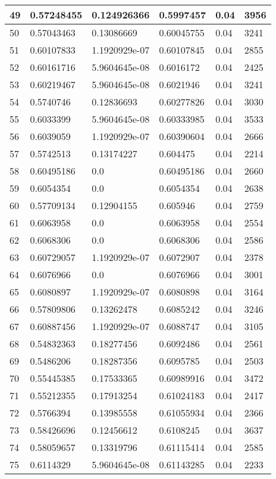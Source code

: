 \begin{longtable}{|l|l|l|l|l|l|}
49 & 0.57248455 & 0.124926366 & 0.5997457 & 0.04 & 3956 \\ \hline 
50 & 0.57043463 & 0.13086669 & 0.60045755 & 0.04 & 3241 \\ \hline 
51 & 0.60107833 & 1.1920929e-07 & 0.60107845 & 0.04 & 2855 \\ \hline 
52 & 0.60161716 & 5.9604645e-08 & 0.6016172 & 0.04 & 2425 \\ \hline 
53 & 0.60219467 & 5.9604645e-08 & 0.6021946 & 0.04 & 3241 \\ \hline 
54 & 0.5740746 & 0.12836693 & 0.60277826 & 0.04 & 3030 \\ \hline 
55 & 0.6033399 & 5.9604645e-08 & 0.60333985 & 0.04 & 3533 \\ \hline 
56 & 0.6039059 & 1.1920929e-07 & 0.60390604 & 0.04 & 2666 \\ \hline 
57 & 0.5742513 & 0.13174227 & 0.604475 & 0.04 & 2214 \\ \hline 
58 & 0.60495186 & 0.0 & 0.60495186 & 0.04 & 2660 \\ \hline 
59 & 0.6054354 & 0.0 & 0.6054354 & 0.04 & 2638 \\ \hline 
60 & 0.57709134 & 0.12904155 & 0.605946 & 0.04 & 2759 \\ \hline 
61 & 0.6063958 & 0.0 & 0.6063958 & 0.04 & 2554 \\ \hline 
62 & 0.6068306 & 0.0 & 0.6068306 & 0.04 & 2586 \\ \hline 
63 & 0.60729057 & 1.1920929e-07 & 0.6072907 & 0.04 & 2378 \\ \hline 
64 & 0.6076966 & 0.0 & 0.6076966 & 0.04 & 3001 \\ \hline 
65 & 0.6080897 & 1.1920929e-07 & 0.6080898 & 0.04 & 3164 \\ \hline 
66 & 0.57809806 & 0.13262478 & 0.6085242 & 0.04 & 3246 \\ \hline 
67 & 0.60887456 & 1.1920929e-07 & 0.6088747 & 0.04 & 3105 \\ \hline 
68 & 0.54832363 & 0.18277456 & 0.6092486 & 0.04 & 2561 \\ \hline 
69 & 0.5486206 & 0.18287356 & 0.6095785 & 0.04 & 2503 \\ \hline 
70 & 0.55445385 & 0.17533365 & 0.60989916 & 0.04 & 3472 \\ \hline 
71 & 0.55212355 & 0.17913254 & 0.61024183 & 0.04 & 2417 \\ \hline 
72 & 0.5766394 & 0.13985558 & 0.61055934 & 0.04 & 2366 \\ \hline 
73 & 0.58426696 & 0.12456612 & 0.6108245 & 0.04 & 3637 \\ \hline 
74 & 0.58059657 & 0.13319796 & 0.61115414 & 0.04 & 2585 \\ \hline 
75 & 0.6114329 & 5.9604645e-08 & 0.61143285 & 0.04 & 2233 \\ \hline 
\end{longtable}